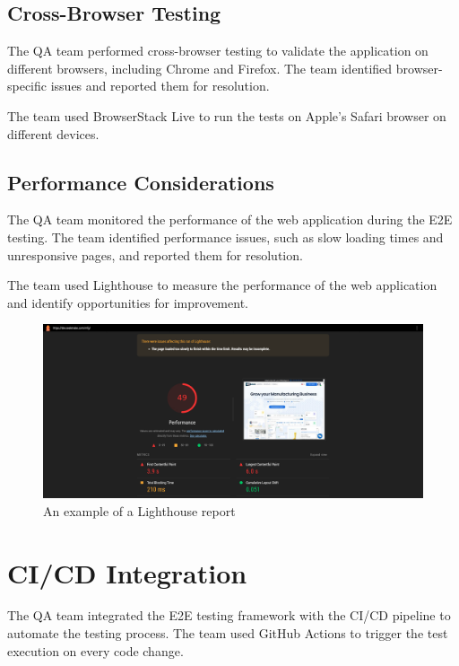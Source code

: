 \subsection{Cross-Browser Testing}

The QA team performed cross-browser testing to validate the application on different browsers, including Chrome and Firefox. The team identified browser-specific issues and reported them for resolution.

The team used BrowserStack Live to run the tests on Apple's Safari browser on different devices.

\subsection{Performance Considerations}

The QA team monitored the performance of the web application during the E2E testing. The team identified performance issues, such as slow loading times and unresponsive pages, and reported them for resolution.

The team used Lighthouse to measure the performance of the web application and identify opportunities for improvement.

\begin{figure}[H]
    \centering
    \includegraphics[width=\textwidth]{project/images/lighthouse-report.png}
    \caption{An example of a Lighthouse report}
    \label{fig:lighthouse-report}
\end{figure}

\section{CI/CD Integration}

The QA team integrated the E2E testing framework with the CI/CD pipeline to automate the testing process. The team used GitHub Actions to trigger the test execution on every code change.


